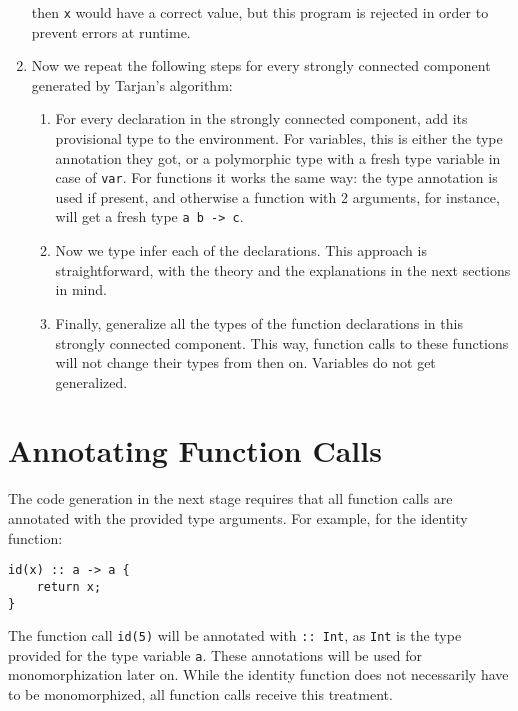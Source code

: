 \begin{enumerate}
    then \lstinline|x| would have a correct value, but this program is rejected in order to prevent errors at runtime.
    \item Now we repeat the following steps for every strongly connected component generated by Tarjan's algorithm:
    \begin{enumerate}
        \item For every declaration in the strongly connected component, add its provisional type to the environment. For variables, this is either the type annotation they got, or a polymorphic type with a fresh type variable in case of \lstinline|var|. For functions it works the same way: the type annotation is used if present, and otherwise a function with 2 arguments, for instance, will get a fresh type \lstinline|a b -> c|.
        \item Now we type infer each of the declarations. This approach is straightforward, with the theory and the explanations in the next sections in mind.
        \item Finally, generalize all the types of the function declarations in this strongly connected component. This way, function calls to these functions will not change their types from then on. Variables do not get generalized.
    \end{enumerate}
\end{enumerate}

\section{Annotating Function Calls}
The code generation in the next stage requires that all function calls are annotated with the provided type arguments. For example, for the identity function:

\begin{lstlisting}
id(x) :: a -> a {
    return x;
}
\end{lstlisting}

The function call \lstinline{id(5)} will be annotated with \lstinline{:: Int}, as \lstinline{Int} is the type provided for the type variable \lstinline{a}. These annotations will be used for monomorphization later on. While the identity function does not necessarily have to be monomorphized, all function calls receive this treatment.

